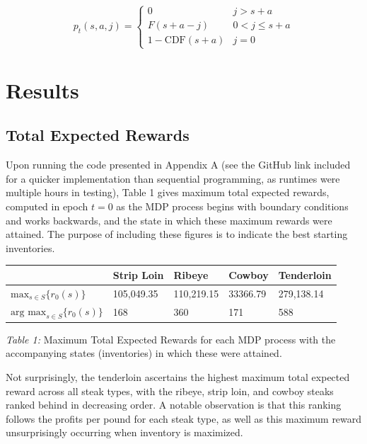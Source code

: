 \documentclass[12pt,a4paper]{article}
\begin{document}
\normalsize

\begin{equation} \label{4}
p_{t}(s,a,j) = \begin{cases} 0 & j > s + a \\ F(s + a - j) & 0 < j \leq s + a \\ 1 - \text{CDF}(s + a) & j = 0 \end{cases}
\end{equation}

\newpage
\section{Results}

\subsection{Total Expected Rewards}

Upon running the code presented in Appendix A (see the GitHub link included for a quicker implementation than sequential programming, as runtimes were multiple hours in testing), Table 1 gives maximum total expected rewards, computed in epoch $t = 0$ as the MDP process begins with boundary conditions and works backwards, and the state in which these maximum rewards were attained. The purpose of including these figures is to indicate the best starting inventories.

\begin{table}[!ht]
    \centering
    \begin{tabular}{|l|l|l|l|l|}
    \hline
        ~ & Strip Loin & Ribeye & Cowboy & Tenderloin \\ \hline
        $\text{max}_{s \in S} \{ r_{0} (s) \}$ & 105,049.35 & 110,219.15 & 33366.79 & 279,138.14 \\ \hline
        $\text{arg max}_{s \in S} \{ r_{0}(s) \} $ & 168 & 360 & 171 & 588 \\ \hline
    \end{tabular}
\end{table}
\small 
\begin{center}
\textit{Table 1:} Maximum Total Expected Rewards for each MDP process with the accompanying states (inventories) in which these were attained.
\end{center}
\normalsize 

Not surprisingly, the tenderloin ascertains the highest maximum total expected reward across all steak types, with the ribeye, strip loin, and cowboy steaks ranked behind in decreasing order. A notable observation is that this ranking follows the profits per pound for each steak type, as well as this maximum reward unsurprisingly occurring when inventory is maximized.
\end{document}
